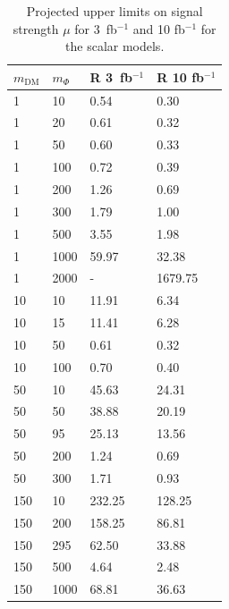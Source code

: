 \begin{table}[h!]
  \small
  \centering
\begin{minipage}{.45\textwidth}{
  \begin{tabular}{llll}
    \hline                      
    $m_\textrm{DM}$ & $m_\Phi$  & R 3~fb$^{-1}$ & R 10 fb$^{-1}$ \\ \hline
    1	& 10	& 0.54	& 0.30 \\ \hline
    1	& 20	& 0.61	& 0.32 \\ \hline
    1	& 50	& 0.60	& 0.33 \\ \hline
    1	& 100	& 0.72	& 0.39 \\ \hline
    1	& 200	& 1.26	& 0.69 \\ \hline
    1	& 300	& 1.79	& 1.00 \\ \hline
    1	& 500	& 3.55	& 1.98 \\ \hline
    1	& 1000	& 59.97	& 32.38 \\ \hline
    1	& 2000	& -    & 1679.75 \\ \hline
    10	& 10	& 11.91	& 6.34 \\ \hline 
    10	& 15	& 11.41	& 6.28 \\ \hline
    10	& 50	& 0.61	& 0.32 \\ \hline
    10	& 100	& 0.70	& 0.40 \\ \hline
    50	& 10	& 45.63	& 24.31 \\ \hline
    50	& 50	& 38.88	& 20.19 \\ \hline
    50	& 95	& 25.13	& 13.56 \\ \hline
    50	& 200	& 1.24	& 0.69 \\ \hline
    50	& 300	& 1.71	& 0.93 \\ \hline
    150	& 10	& 232.25& 128.25 \\ \hline
    150	& 200	& 158.25& 86.81 \\ \hline
    150	& 295	& 62.50	& 33.88 \\ \hline
    150	& 500	& 4.64	& 2.48 \\ \hline
    150	& 1000	& 68.81	& 36.63 \\ \hline
  \end{tabular}
  \caption{Projected  upper limits on signal strength $\mu$ for 3~fb$^{-1}$ and 10 fb$^{-1}$ for the scalar models. \label{tab:dm_S_R_values}}
}\end{minipage}%
\hfill
\begin{minipage}{.45\textwidth}{
}
\end{minipage}
\end{table}
